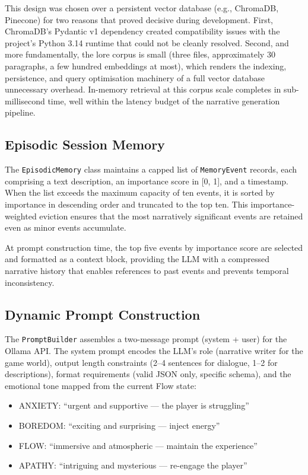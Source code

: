 This design was chosen over a persistent vector database (e.g., ChromaDB, Pinecone) for two reasons that proved decisive during development. First, ChromaDB's Pydantic v1 dependency created compatibility issues with the project's Python 3.14 runtime that could not be cleanly resolved. Second, and more fundamentally, the lore corpus is small (three files, approximately 30 paragraphs, a few hundred embeddings at most), which renders the indexing, persistence, and query optimisation machinery of a full vector database unnecessary overhead. In-memory retrieval at this corpus scale completes in sub-millisecond time, well within the latency budget of the narrative generation pipeline.

\subsection{Episodic Session Memory}

The \texttt{EpisodicMemory} class maintains a capped list of \texttt{MemoryEvent} records, each comprising a text description, an importance score in [0, 1], and a timestamp. When the list exceeds the maximum capacity of ten events, it is sorted by importance in descending order and truncated to the top ten. This importance-weighted eviction ensures that the most narratively significant events are retained even as minor events accumulate.

At prompt construction time, the top five events by importance score are selected and formatted as a context block, providing the LLM with a compressed narrative history that enables references to past events and prevents temporal inconsistency.

\subsection{Dynamic Prompt Construction}

The \texttt{PromptBuilder} assembles a two-message prompt (system + user) for the Ollama API. The system prompt encodes the LLM's role (narrative writer for the game world), output length constraints (2--4 sentences for dialogue, 1--2 for descriptions), format requirements (valid JSON only, specific schema), and the emotional tone mapped from the current Flow state:

\begin{itemize}
\item ANXIETY: ``urgent and supportive --- the player is struggling''
\item BOREDOM: ``exciting and surprising --- inject energy''
\item FLOW: ``immersive and atmospheric --- maintain the experience''
\item APATHY: ``intriguing and mysterious --- re-engage the player''
\end{itemize}

